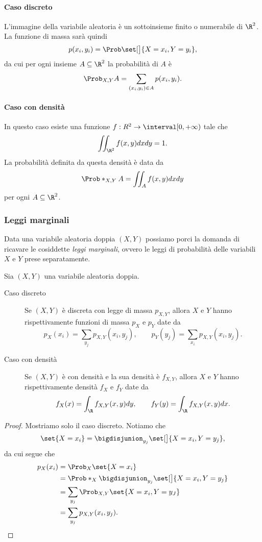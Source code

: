 \paragraph{Caso discreto} L'immagine della variabile aleatoria è un sottoinsieme finito o numerabile di $\R^2$. La funzione di massa sarà quindi \[
    p(x_i, y_i) = \Prob\set[\big]{X = x_i, Y = y_i},    
\] da cui per ogni insieme $A \subseteq \R^2$ la probabilità di $A$ è \[
    \Prob_{X, Y}{A} = \sum_{(x_i, y_i) \in A} p(x_i, y_i).    
\]

\paragraph{Caso con densità} In questo caso esiste una funzione $f : R^2 \to \interval[{0, +\infty})$ tale che \[
    \iint_{\R^2} f(x, y)dxdy = 1.    
\] La probabilità definita da questa densità è data da \[
    \Prob*_{X, Y}{A} = \iint_{A} f(x, y)dxdy    
\] per ogni $A \subseteq \R^2$.

\subsubsection{Leggi marginali}
Data una variabile aleatoria doppia $(X, Y)$ possiamo porci la domanda di ricavare le cosiddette \emph{leggi marginali}, ovvero le leggi di probabilità delle variabili $X$ e $Y$ prese separatamente.

\begin{proposition}
    Sia $(X, Y)$ una variabile aleatoria doppia.
    \begin{description}
        \item[Caso discreto] Se $(X, Y)$ è discreta con legge di massa $p_{X, Y}$, allora $X$ e $Y$ hanno rispettivamente funzioni di massa $p_X$ e $p_Y$ date da \[
            p_X(x_i) = \sum_{y_j}p_{X, Y}(x_i, y_j), \qquad  p_Y(y_j) = \sum_{x_i}p_{X, Y}(x_i, y_j).
        \]
        \item[Caso con densità] Se $(X, Y)$ è con densità e la sua densità è $f_{X, Y}$, allora $X$ e $Y$ hanno rispettivamente densità $f_X$ e $f_Y$ date da \[
            f_X(x) = \int_{\R}f_{X, Y}(x, y)dy, \qquad  f_Y(y) = \int_{\R}f_{X, Y}(x, y)dx.
        \]
    \end{description}
\end{proposition}
\begin{proof}
    Mostriamo solo il caso discreto. Notiamo che \[
        \set{X = x_i} = \bigdisjunion_{y_j} \set[\big]{X = x_i, Y = y_j},    
    \] da cui segue che \begin{align*}
        p_X(x_i) &= \Prob_{X}\set{X=x_i}\\
        &= \Prob*_{X}{\bigdisjunion_{y_j} \set[\big]{X = x_i, Y = y_j}}\\
        &= \sum_{y_j} \Prob_{X, Y}\set{X = x_i, Y = y_J}\\
        &= \sum_{y_j} p_{X, Y}(x_i, y_j). \qedhere
    \end{align*}
\end{proof}

